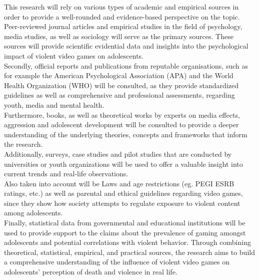 This research will rely on various types of academic and empirical sources in order to provide a well-rounded and evidence-based perspective on the topic.
Peer-reviewed journal articles and empirical studies in the field of psychology, media studies, as well as sociology will serve as the primary sources.
These sources will provide scientific evidential data and insights into the psychological impact of violent video games on adolescents. \\
Secondly, official reports and publications from reputable organisations, such as for example the American Psychological Association (APA)
and the World Health Organization (WHO)  will be consulted, as they provide standardized guidelines as well as comprehensive and professional assessments,
regarding youth, media and mental health. \\
Furthermore, books, as well as theoretical works by experts on media effects, aggression and adolescent development will be consulted to provide a deeper
understanding of the underlying theories, concepts and frameworks that inform the research. \\
Additionally, surveys, case studies and pilot studies that are conducted by universities or youth organizations will be used to offer a valuable insight
into current trends and real-life observations. \\
Also taken into account will be Laws and age restrictions (eg. PEGI ESRB ratings, etc.) as well as parental and ethical guidelines regarding video games, 
since they show how society attempts to regulate exposure to violent content among adolescents. \\
Finally, statistical data from governmental and educational institutions will be used to provide support to the claims about the prevalence of gaming amongst
adolescents and potential correlations with violent behavior. Through combining theoretical, statistical, empirical, and practical sources, the research aims 
to build a comprehensive understanding of the influence of violent video games on adolescents' perception of death and violence in real life.